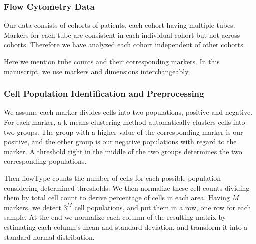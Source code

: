 \subsubsection{Flow Cytometry Data}
Our data consists of cohorts of patients, each cohort having multiple tubes. Markers for each tube are consistent in each individual cohort but not across cohorts. Therefore we have analyzed each cohort independent of other cohorts.

Here we mention tube counts and their corresponding markers. In this manuscript, we use markers and dimensions interchangeably.

\subsubsection{Cell Population Identification and Preprocessing}
We assume each marker divides cells into two populations, positive and negative. For each marker, a k-means clustering method automatically clusters cells into two groups. The group with a higher value of the corresponding marker is our positive, and the other group is our negative populations with regard to the marker. A threshold right in the middle of the two groups determines the two corresponding populations.

Then flowType counts the number of cells for each possible population considering determined thresholds. We then normalize these cell counts dividing them by total cell count to derive percentage of cells in each area. Having $M$ markers, we detect $3^M$ cell populations, and put them in a row, one row for each sample. At the end we normalize each column of the resulting matrix by estimating each column's mean and standard deviation, and transform it into a standard normal distribution.
